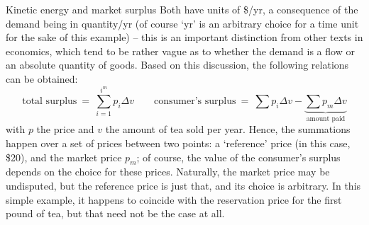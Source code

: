 \begin{econ}{Kinetic energy and market surplus}
    Both have units of \$/yr, a consequence of the demand being in quantity/yr (of course `yr' is an arbitrary choice for a time unit for the sake of this example) -- this is an important distinction from other texts in economics, which tend to be rather vague as to whether the demand is a flow or an absolute quantity of goods. Based on this discussion, the following relations can be obtained:
    \begin{equation}
        \text{total surplus}\: =\: \sum_{i = 1}^{i^m} p_i \Delta v \qquad \text{consumer's surplus} \:=\: \sum p_i \Delta v - \underbrace{\sum p_m \Delta v}_{\text{amount paid}}
    \label{eq:surplus}
    \end{equation}
    with $p$ the price and $v$ the amount of tea sold per year. Hence, the summations happen over a set of prices between two points: a `reference' price (in this case, \$20), and the market price $p_m$; of course, the value of the consumer's surplus depends on the choice for these prices. Naturally, the market price may be undisputed, but the reference price is just that, and its choice is arbitrary. In this simple example, it happens to coincide with the reservation price for the first pound of tea, but that need not be the case at all.


\end{econ}
